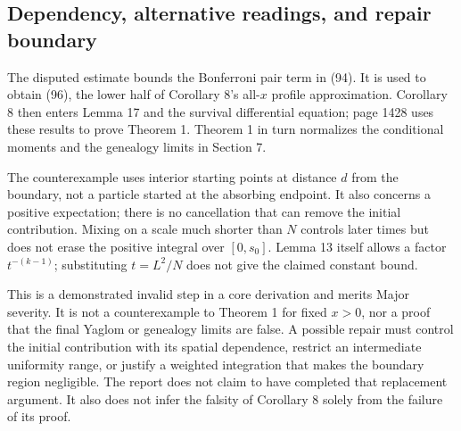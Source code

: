 \documentclass[10pt]{article}
\begin{document}
\subsection*{Dependency, alternative readings, and repair boundary}
The disputed estimate bounds the Bonferroni pair term in (94). It is used to obtain (96), the lower half of Corollary 8’s all-\(x\) profile approximation. Corollary 8 then enters Lemma 17 and the survival differential equation; page 1428 uses these results to prove Theorem 1. Theorem 1 in turn normalizes the conditional moments and the genealogy limits in Section 7.\par
The counterexample uses interior starting points at distance \(d\) from the boundary, not a particle started at the absorbing endpoint. It also concerns a positive expectation; there is no cancellation that can remove the initial contribution. Mixing on a scale much shorter than \(N\) controls later times but does not erase the positive integral over \([0,s_0]\). Lemma 13 itself allows a factor \(t^{-(k-1)}\); substituting \(t=L^2/N\) does not give the claimed constant bound.\par
This is a demonstrated invalid step in a core derivation and merits Major severity. It is not a counterexample to Theorem 1 for fixed \(x>0\), nor a proof that the final Yaglom or genealogy limits are false. A possible repair must control the initial contribution with its spatial dependence, restrict an intermediate uniformity range, or justify a weighted integration that makes the boundary region negligible. The report does not claim to have completed that replacement argument. It also does not infer the falsity of Corollary 8 solely from the failure of its proof.\par
\end{document}
